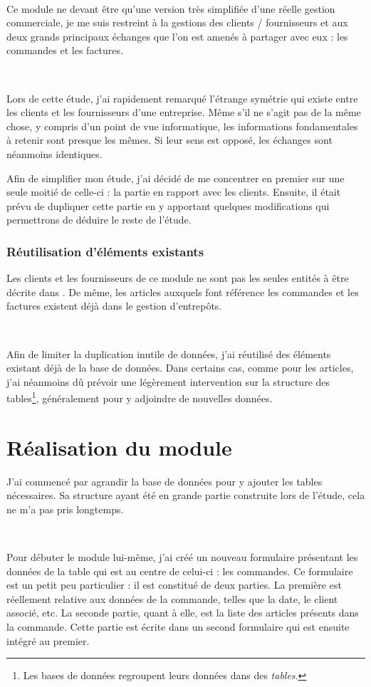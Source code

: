 ~

Ce module ne devant être qu'une version très simplifiée d'une \og réelle \fg{} gestion commerciale, je me suis restreint à la gestions des clients / fournisseurs et aux deux grands principaux échanges que l'on est amenés à partager avec eux : les commandes et les factures.

~

Lors de cette étude, j'ai rapidement remarqué l'étrange symétrie qui existe entre les clients et les fournisseurs d'une entreprise. Même s'il ne s'agit pas de la même chose, y compris d'un point de vue informatique, les informations fondamentales à retenir sont presque les mêmes. Si leur sens est opposé, les échanges sont néanmoins identiques.

Afin de simplifier mon étude, j'ai décidé de me concentrer en premier sur une seule moitié de celle-ci : la partie en rapport avec les clients. Ensuite, il était prévu de dupliquer cette partie en y apportant quelques modifications qui permettrons de déduire le reste de l'étude.

\subsubsection{Réutilisation d'éléments existants}
Les clients et les fournisseurs de ce module ne sont pas les seules \og entités \fg{} à être décrite dans \integrale. De même, les articles auxquels font référence les commandes et les factures existent déjà dans le gestion d'entrepôts.

~

Afin de limiter la duplication inutile de données, j'ai réutilisé des éléments existant déjà de la base de données. Dans certains cas, comme pour les articles, j'ai néanmoins dû prévoir une légèrement intervention sur la structure des tables\footnote{Les bases de données regroupent leurs données dans des \emph{tables}.}, généralement pour y adjoindre de nouvelles données.

\section{Réalisation du module}
J'ai commencé par agrandir la base de données pour y ajouter les tables nécessaires. Sa structure ayant été en grande partie construite lors de l'étude, cela ne m'a pas pris longtemps.

~

Pour débuter le module lui-même, j'ai créé un nouveau formulaire présentant les données de la table qui est au centre de celui-ci : les commandes. Ce formulaire est un petit peu particulier : il est constitué de deux parties. La première est réellement relative aux données de la commande, telles que la date, le client associé, etc. La seconde partie, quant à elle, est la liste des articles présents dans la commande. Cette partie est écrite dans un second formulaire qui est ensuite intégré au premier.

